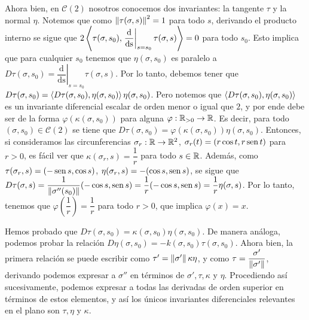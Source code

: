 Ahora bien, en $\mathscr{C}(2)$ nosotros conocemos dos invariantes: la tangente $\tau$ y la normal $\eta$. Notemos que como $\left\| \tau(\sigma,s) \right\|^2 = 1$ para todo $s$, derivando el producto interno se sigue que $2\left\langle \tau(\sigma,s_0),\left.\dfrac{\mathrm{d}}{\mathrm{ds}}\right\rvert_{s=s_0}\tau(\sigma,s) \right\rangle = 0$ para todo $s_0$. Esto implica que para cualquier $s_0$ tenemos que $\eta(\sigma,s_0)$ es paralelo a $D\tau(\sigma,s_0)=\left.\dfrac{\mathrm{d}}{\mathrm{ds}}\right\rvert_{s=s_0} \tau(\sigma,s)$. Por lo tanto, debemos tener que $D\tau(\sigma,s_0) = \left\langle D\tau(\sigma,s_0),\eta(\sigma,s_0) \right\rangle\eta(\sigma,s_0)$. Pero notemos que $\left\langle D\tau(\sigma,s_0),\eta(\sigma,s_0) \right\rangle$ es un invariante diferencial escalar de orden menor o igual que $2$, y por ende debe ser de la forma $\varphi(\kappa(\sigma,s_0))$ para alguna $\varphi:\mathbb{R}_{>0}\to\mathbb{R}$. Es decir, para todo $(\sigma,s_0)\in\mathscr{C}(2)$ se tiene que $D\tau(\sigma,s_0)=\varphi(\kappa(\sigma,s_0))\eta(\sigma,s_0)$. Entonces, si consideramos las circunferencias $\sigma_r:\mathbb{R}\to\mathbb{R}^2$, $\sigma_r(t)=(r\cos t,r\operatorname{sen} t)$ para $r>0$, es fácil ver que $\kappa(\sigma_r,s)=\dfrac{1}{r}$ para todo $s\in\mathbb{R}$. Además, como $\tau(\sigma_r,s)=(-\operatorname{sen} s,\cos s)$, $\eta(\sigma_r,s)=-(\cos s,\operatorname{sen} s)$, se sigue que $D\tau(\sigma,s)=\dfrac{1}{\left\| \sigma''(s_0) \right\|}(-\cos s,\operatorname{sen} s) = \dfrac{1}{r}(-\cos s,\operatorname{sen} s) = \dfrac{1}{r}\eta(\sigma,s)$. Por lo tanto, tenemos que $\varphi\left(\dfrac{1}{r}\right)=\dfrac{1}{r}$ para todo $r>0$, que implica $\varphi(x)=x$. 

Hemos probado que $D\tau(\sigma,s_0)=\kappa(\sigma,s_0)\eta(\sigma,s_0)$. De manera análoga, podemos probar la relación $D\eta(\sigma,s_0)=-k(\sigma,s_0)\tau(\sigma,s_0)$. Ahora bien, la primera relación se puede escribir como $\tau' = \left\| \sigma' \right\|\kappa\eta$, y como $\tau = \dfrac{\sigma'}{\left\| \sigma' \right\|}$, derivando podemos expresar a $\sigma''$ en términos de $\sigma',\tau,\kappa$ y $\eta$. Procediendo así sucesivamente, podemos expresar a todas las derivadas de orden superior en términos de estos elementos, y así los únicos invariantes diferenciales relevantes en el plano son $\tau,\eta$ y $\kappa$.



